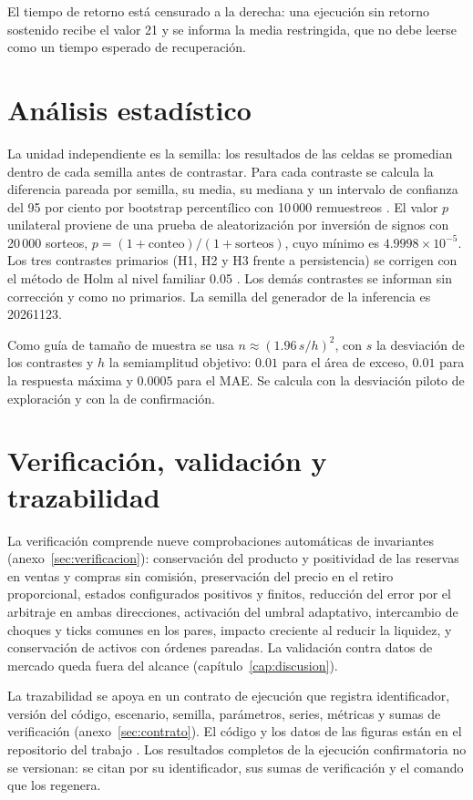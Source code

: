 El tiempo de retorno está censurado a la derecha: una ejecución sin retorno sostenido recibe el valor 21 y se informa la media restringida, que no debe leerse como un tiempo esperado de recuperación.

\section{Análisis estadístico}
\label{sec:analisis-estadistico}

La unidad independiente es la semilla: los resultados de las celdas se promedian dentro de cada semilla antes de contrastar. Para cada contraste se calcula la diferencia pareada por semilla, su media, su mediana y un intervalo de confianza del 95 por ciento por bootstrap percentílico con 10\,000 remuestreos \cite{efron1979bootstrap}. El valor $p$ unilateral proviene de una prueba de aleatorización por inversión de signos con 20\,000 sorteos, $p=(1+\text{conteo})/(1+\text{sorteos})$, cuyo mínimo es $4.9998\times10^{-5}$. Los tres contrastes primarios (H1, H2 y H3 frente a persistencia) se corrigen con el método de Holm al nivel familiar 0.05 \cite{holm1979simple}. Los demás contrastes se informan sin corrección y como no primarios. La semilla del generador de la inferencia es 20261123.

Como guía de tamaño de muestra se usa $n\approx(1.96\,s/h)^2$, con $s$ la desviación de los contrastes y $h$ la semiamplitud objetivo: $0.01$ para el área de exceso, $0.01$ para la respuesta máxima y $0.0005$ para el MAE. Se calcula con la desviación piloto de exploración y con la de confirmación.

\section{Verificación, validación y trazabilidad}

La verificación comprende nueve comprobaciones automáticas de invariantes (anexo~\ref{sec:verificacion}): conservación del producto y positividad de las reservas en ventas y compras sin comisión, preservación del precio en el retiro proporcional, estados configurados positivos y finitos, reducción del error por el arbitraje en ambas direcciones, activación del umbral adaptativo, intercambio de choques y ticks comunes en los pares, impacto creciente al reducir la liquidez, y conservación de activos con órdenes pareadas. La validación contra datos de mercado queda fuera del alcance (capítulo~\ref{cap:discusion}).

La trazabilidad se apoya en un contrato de ejecución que registra identificador, versión del código, escenario, semilla, parámetros, series, métricas y sumas de verificación (anexo~\ref{sec:contrato}). El código y los datos de las figuras están en el repositorio del trabajo \cite{calderon2026repository}. Los resultados completos de la ejecución confirmatoria no se versionan: se citan por su identificador, sus sumas de verificación y el comando que los regenera.

